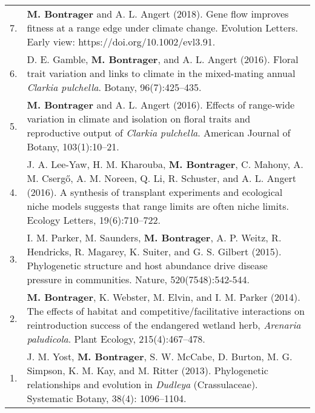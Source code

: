 \documentclass[letterpaper,11pt,oneside]{article}
\newcommand\hangbibentry[1]{%
    \smallskip\par\hangpara{1em}{1}\bibentry{#1}\smallskip\par 
}
\begin{document}
\def\arraystretch{1.2}
\noindent \begin{tabular}{@{} p{1cm} >{\raggedright\arraybackslash}p{15.11cm}}
7. & \textbf{M. Bontrager} and A. L. Angert (2018). Gene flow improves fitness at a range edge under climate change. Evolution Letters. Early view: https://doi.org/10.1002/evl3.91. \\
6. & D. E. Gamble, \textbf{M. Bontrager}, and A. L. Angert (2016). Floral trait variation and links to climate in the mixed-mating annual \textit{Clarkia pulchella}. Botany, 96(7):425–435. \\
5. & \textbf{M. Bontrager} and A. L. Angert (2016). Effects of range-wide variation in climate and isolation on floral traits and reproductive output of \textit{Clarkia pulchella}. American Journal of Botany, 103(1):10–21.  \\
4. & J. A. Lee-Yaw, H. M. Kharouba, \textbf{M. Bontrager}, C. Mahony, A. M. Cserg{\H{o}}, A. M. Noreen, Q. Li, R. Schuster, and A. L. Angert (2016). A synthesis of transplant experiments and ecological niche models suggests that range limits are often niche limits. Ecology Letters, 19(6):710–722. \\
3. & I. M. Parker, M. Saunders, \textbf{M. Bontrager}, A. P. Weitz, R. Hendricks, R. Magarey, K. Suiter, and G. S. Gilbert (2015). Phylogenetic structure and host abundance drive disease pressure in communities. Nature, 520(7548):542-544. \\
2. & \textbf{M. Bontrager}, K. Webster, M. Elvin, and I. M. Parker (2014). The effects of habitat and competitive/facilitative interactions on reintroduction success of the endangered wetland herb, \textit{Arenaria paludicola}. Plant Ecology, 215(4):467–478. \\
1. & J. M. Yost, \textbf{M. Bontrager}, S. W. McCabe, D. Burton, M. G. Simpson, K. M. Kay, and M. Ritter (2013). Phylogenetic relationships and evolution in \textit{Dudleya} (Crassulaceae). Systematic Botany, 38(4): 1096–1104. \\
\end{tabular}
\egroup
\bigskip
\bigskip
\end{document}

